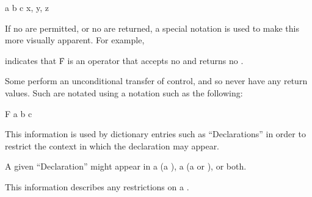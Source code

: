  {a b c} {x, y, z}


If no  are permitted, or no  are returned, 
a special notation is used to make this more visually apparent.  For example,

 {\noargs} {\novalues}

indicates that \f{F} is an operator that accepts no  and returns
no .

\endsubsubsubsubsection%


Some  perform an unconditional transfer of control, and
so never have any return values.  Such  are notated using
a notation such as the following:

\DefunNoReturn F {a b c}

\endsubsubsubsubsection%

\endsubsubsubsection%

\endsubsubsection%


This information is used by dictionary entries such as ``Declarations''
in order to restrict the context in which the declaration may appear.

A given ``Declaration'' might appear in 
     a  (\ie a  ),
     a  (\ie a  or  ),
  or both.

\endsubsubsection%


This information describes any  restrictions on a .

\endsubsubsection%

\endsubSection%
